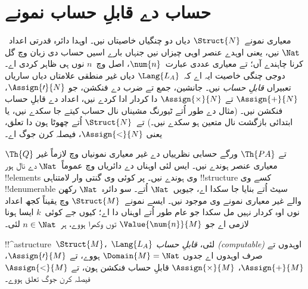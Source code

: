 \documentclass[../../../include/open-logic-section]{subfiles}
\begin{document}
\section{حساب دے قابلِ حساب نمونے}

\begin{explain}
معیاری نمونے~$\Struct{N}$ دیاں دو چنگیاں خاصیتاں نیں۔
اوہدا دائرہ قدرتی اعداد~$\Nat$ نیں، یعنی اوہدے عنصر
اوہی چیزاں نیں جنہاں بارے اسیں حساب دی زبان وچ گل
کرنا چاہندے آں؛ تے معیاری عددی عبارت~$\num{n}$،
اصل وچ~$n$ نوں ہی ظاہر کردی اے۔ دوجی چنگی خاصیت
ایہ اے کہ~$\Lang{L_A}$ دیاں غیر منطقی علامتاں
دیاں ساریاں تعبیراں \emph{قابلِ حساب} نیں۔
جانشین، جمع تے ضرب دے فنکشن، جو
$\Assign{\prime}{N}$، $\Assign{+}{N}$ تے
$\Assign{\times}{N}$ دا کردار ادا کردے نیں،
اعداد دے قابلِ حساب فنکشن نیں۔ (مثال دے طور اُتے
ٹیورنگ مشیناں نال حساب کیتے جا سکدے نیں، یا
ابتدائی بازگشت نال متعین ہو سکدے نیں۔)
تے~$\Struct{N}$ اُتے چھوٹا ہون دا تعلق، یعنی
$\Assign{<}{N}$، فیصلہ کرن جوگ اے۔

$\Th{Q}$ تے $\Th{PA}$ ورگے حسابی نظرییاں دے غیر
معیاری نمونیاں وچ لازماً غیر معیاری عنصر ہوندے نیں۔
ایس لئی اوہناں دے دائریاں وچ عموماً~$\Nat$ دے
نال ہور !!{element}s وی ہوندے نیں۔ پر کوئی وی
گنتی وار لامتناہی !!{structure} کسے وی !!{denumerable}
سیٹ اُتے بنایا جا سکدا اے، جیویں~$\Nat$ اُتے۔
سو دائرہ~$\Nat$ رکھن والے غیر معیاری نمونے وی
موجود نیں۔ ایسے نمونے~$\Struct{M}$ وچ یقیناً
کجھ اعداد نوں اوہ کردار نہیں مل سکدا جو عام طور
اُتے اوہناں دا اے؛ کیوں جے کوئی~$k$ ایسا ہونا
لازمی اے جو $\Value{\num{n}}{M}$ توں
وکھرا ہووے، ہر~$n \in \Nat$ لئی۔
\end{explain}

\begin{defn}
!!^a{structure}~$\Struct{M}$،~$\Lang{L_A}$ لئی،
\emph{قابلِ حساب (computable)} اوہدوں تے صرف
اوہدوں اے جدوں $\Domain{M} = \Nat$ ہووے، تے
$\Assign{\prime}{M}$، $\Assign{+}{M}$،
$\Assign{\times}{M}$ قابلِ حساب فنکشن ہون،
تے $\Assign{<}{M}$ فیصلہ کرن جوگ تعلق ہووے۔
\end{defn}
\end{document}
